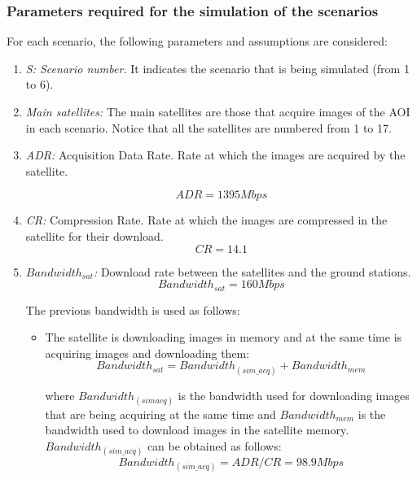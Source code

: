 \subsubsection{Parameters required for the simulation of the scenarios}
\label{subsubsec:parameters-required}
For each scenario, the following parameters and assumptions are considered:
\begin{enumerate}
\item \emph{S: Scenario number.} It indicates the scenario that is being simulated (from 1 to 6).
\item \emph{Main satellites:} The main satellites are those that acquire images of the AOI in each scenario. Notice that all the satellites are numbered from 1 to 17.
\item \emph{ADR:} Acquisition Data Rate. Rate at which the images are acquired
  by the satellite.

\begin{equation} \label{eq:ADR}
ADR=1395Mbps
\end{equation}

\item \emph{CR:} Compression Rate. Rate at which the images are compressed in
  the satellite for their download.
\begin{equation}\label{eq:CR}
CR=14.1
\end{equation}
\item \emph{$Bandwidth_{sat}$:} Download rate between the satellites and the
  ground stations.
\begin{equation}\label{eq:Bandwidth}
Bandwidth_{sat}=160Mbps
\end{equation}

The previous bandwidth is used as follows:
\begin{itemize}
\item The satellite is downloading images in memory and at the same time is
  acquiring images and downloading them:
\begin{equation}\label{eq:totalBandwidth}
Bandwidth_{sat}=Bandwidth_{(sim\_acq)}+Bandwidth_{mem}
\end{equation}

where $Bandwidth_{(sim_{}acq)}$ is the bandwidth used for downloading images that
are being acquiring at the same time and $Bandwidth_{mem}$ is the bandwidth used
to download images in the satellite memory. $Bandwidth_{(sim\_acq)}$ can be
obtained as follows:
\begin{equation}\label{eq:bandwidth-sim}
  Bandwidth_{(sim\_acq)}=ADR/CR=98.9Mbps
\end{equation}


\end{itemize}
\end{enumerate}

